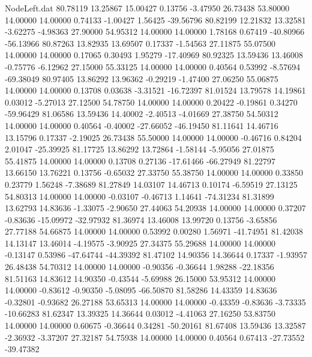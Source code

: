 \begin{filecontents}{NodeLeft.dat}
  80.78119   13.25867   15.00427     0.13756   -3.47950   26.73438   53.80000   14.00000   14.00000    0.74133   -1.00427    1.56425  -39.56796
  80.82199   12.21832   13.32581    -3.62275   -4.98363   27.90000   54.95312   14.00000   14.00000    1.78168    0.67419  -40.80966  -56.13966
  80.87263   13.82935   13.69507     0.17337   -1.54563   27.11875   55.07500   14.00000   14.00000    0.17065    0.30493    1.95279  -17.40969
  80.92325   13.59436   13.46008    -0.75776   -6.12962   27.15000   55.33125   14.00000   14.00000    0.40564    0.53992   -8.57694  -69.38049
  80.97405   13.86292   13.96362    -0.29219   -1.47400   27.06250   55.06875   14.00000   14.00000    0.13708    0.03638   -3.31521  -16.72397
  81.01524   13.79578   14.19861     0.03012   -5.27013   27.12500   54.78750   14.00000   14.00000    0.20422   -0.19861    0.34270  -59.96429
  81.06586   13.59436   14.40002    -2.40513   -4.01669   27.38750   54.50312   14.00000   14.00000    0.40564   -0.40002  -27.66052  -46.19450
  81.11641   14.46716   13.15796     0.17337   -2.19025   26.73438   55.50000   14.00000   14.00000   -0.46716    0.84204    2.01047  -25.39925
  81.17725   13.86292   13.72864    -1.58144   -5.95056   27.01875   55.41875   14.00000   14.00000    0.13708    0.27136  -17.61466  -66.27949
  81.22797   13.66150   13.76221     0.13756   -0.65032   27.33750   55.38750   14.00000   14.00000    0.33850    0.23779    1.56248   -7.38689
  81.27849   14.03107   14.46713     0.10174   -6.59519   27.13125   54.80313   14.00000   14.00000   -0.03107   -0.46713    1.14641  -74.31234
  81.31899   13.62793   14.83636    -1.33075   -2.90650   27.44063   54.20938   14.00000   14.00000    0.37207   -0.83636  -15.09972  -32.97932
  81.36974   13.46008   13.99720     0.13756   -3.65856   27.77188   54.66875   14.00000   14.00000    0.53992    0.00280    1.56971  -41.74951
  81.42038   14.13147   13.46014    -4.19575   -3.90925   27.34375   55.29688   14.00000   14.00000   -0.13147    0.53986  -47.64744  -44.39392
  81.47102   14.90356   14.36644     0.17337   -1.93957   26.48438   54.70312   14.00000   14.00000   -0.90356   -0.36644    1.98288  -22.18356
  81.51163   14.83612   14.90350    -0.43544   -5.69988   26.15000   53.95312   14.00000   14.00000   -0.83612   -0.90350   -5.08095  -66.50870
  81.58286   14.43359   14.83636    -0.32801   -0.93682   26.27188   53.65313   14.00000   14.00000   -0.43359   -0.83636   -3.73335  -10.66283
  81.62347   13.39325   14.36644     0.03012   -4.41063   27.16250   53.83750   14.00000   14.00000    0.60675   -0.36644    0.34281  -50.20161
  81.67408   13.59436   13.32587    -2.36932   -3.37207   27.32187   54.75938   14.00000   14.00000    0.40564    0.67413  -27.73552  -39.47382

\end{filecontents}
